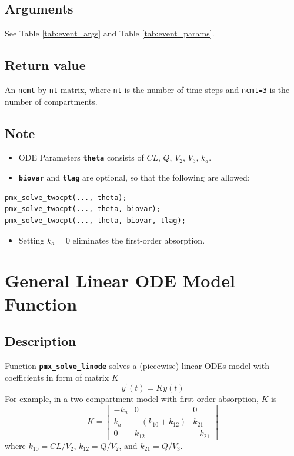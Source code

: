 \documentclass[10pt, reqno, oneside]{amsbook}
\numberwithin{equation}{chapter}
\numberwithin{figure}{chapter}
\numberwithin{table}{chapter}
\theoremstyle{remark}
\begin{document}
\subsection{Arguments}
\label{sec:org16845e9}
See Table \ref{tab:event_args} and Table \ref{tab:event_params}.

\subsection{Return value}
\label{sec:orgfea9798}
An \texttt{ncmt}-by-\texttt{nt} matrix, where \texttt{nt} is the number of time steps and \texttt{ncmt=3} is the number of compartments.

\subsection{Note}
\label{sec:org4dbf166}
\begin{itemize}
\item ODE Parameters {\small \color{MRGGreen} \texttt{\textbf{theta}}} consists of \(CL\), \(Q\), \(V_2\), \(V_3\), \(k_a\).
\item {\small \color{MRGGreen} \texttt{\textbf{biovar}}} and {\small \color{MRGGreen} \texttt{\textbf{tlag}}} are optional, so that the following are allowed:
\end{itemize}
\begin{verbatim}
pmx_solve_twocpt(..., theta);
pmx_solve_twocpt(..., theta, biovar);
pmx_solve_twocpt(..., theta, biovar, tlag);
\end{verbatim}
\begin{itemize}
\item Setting \(k_a = 0\) eliminates the first-order absorption.
\end{itemize}

\section{General Linear ODE Model Function}
\label{sec:org1b9f7e0}
\subsection{Description}
\label{sec:orgc937e1c}
Function {\small \color{MRGGreen} \texttt{\textbf{pmx\_solve\_linode}}} solves a (piecewise) linear ODEs model with coefficients
in form of matrix \(K\)
\begin{equation}
y^\prime\left(t\right) = Ky\left(t\right)
\end{equation}
For example, in a two-compartment model with first order absorption, \(K\) is
\begin{equation}
  K = \left[\begin{array}{ccc}
              -k_a & 0 & 0 \\
              k_a & -\left(k_{10} + k_{12}\right) & k_{21} \\
              0 & k_{12} & -k_{21}
            \end{array}\right]
\end{equation}
where \(k_{10}=CL/V_2\), \(k_{12}=Q/V_2\), and \(k_{21}=Q/V_3\).
\end{document}
